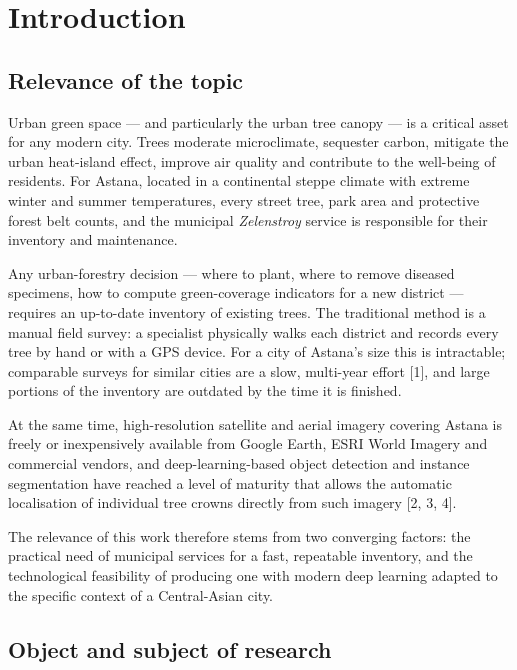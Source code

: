 \chapter{Introduction}\label{introduction}

\section{Relevance of the topic}\label{relevance-of-the-topic}

Urban green space --- and particularly the urban tree canopy --- is a critical asset for any modern city. Trees moderate microclimate, sequester carbon, mitigate the urban heat-island effect, improve air quality and contribute to the well-being of residents. For Astana, located in a continental steppe climate with extreme winter and summer temperatures, every street tree, park area and protective forest belt counts, and the municipal \emph{Zelenstroy} service is responsible for their inventory and maintenance.

Any urban-forestry decision --- where to plant, where to remove diseased specimens, how to compute green-coverage indicators for a new district --- requires an up-to-date inventory of existing trees. The traditional method is a manual field survey: a specialist physically walks each district and records every tree by hand or with a GPS device. For a city of Astana's size this is intractable; comparable surveys for similar cities are a slow, multi-year effort {[}1{]}, and large portions of the inventory are outdated by the time it is finished.

At the same time, high-resolution satellite and aerial imagery covering Astana is freely or inexpensively available from Google Earth, ESRI World Imagery and commercial vendors, and deep-learning-based object detection and instance segmentation have reached a level of maturity that allows the automatic localisation of individual tree crowns directly from such imagery {[}2, 3, 4{]}.

The relevance of this work therefore stems from two converging factors: the practical need of municipal services for a fast, repeatable inventory, and the technological feasibility of producing one with modern deep learning adapted to the specific context of a Central-Asian city.

\section{Object and subject of research}\label{object-and-subject-of-research}

